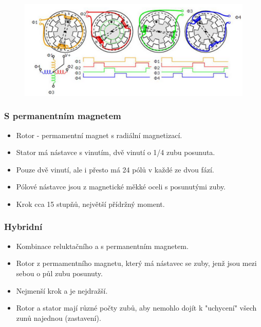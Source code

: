 \begin{figure}[h]
    \begin{center}
        \includegraphics[scale = 1]{img/picture7.png}
    \end{center}
\end{figure}

\subsubsection*{S permanentním magnetem}
\begin{itemize}
    \item Rotor - permamentní magnet s radiální magnetizací.
    \item Stator má nástavce s vinutím, dvě vinutí o 1/4 zubu posunuta.
    \item Pouze dvě vinutí, ale i přesto má 24 pólů v každé ze dvou fází.
    \item Pólové nástavce jsou z magnetické měkké oceli s posunutými zuby.
    \item Krok cca 15 stupňů, největší přídržný moment.
\end{itemize}

\subsubsection*{Hybridní}
\begin{itemize}
    \item Kombinace reluktačního a s permanentním magnetem.
    \item Rotor z permamentního magnetu, který má nástavec se zuby, jenž jsou mezi sebou o půl zubu posunuty.
    \item Nejmenší krok a je nejdražší.
    \item Rotor a stator mají různé počty zubů, aby nemohlo dojít k "uchycení" všech zunů najednou (zastavení).
\end{itemize}


